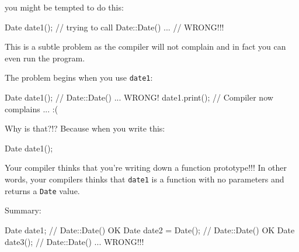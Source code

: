 you might be tempted to do this:

\begin{consolethree}[escapeinside=||]
Date date1();  // trying to call Date::Date() ...
               // WRONG!!!
\end{consolethree}

This is a subtle problem as the compiler will not complain and in fact
you can even run the program.

The problem begins when you use \texttt{date1}:

\begin{consolethree}[escapeinside=||]
Date date1();  // Date::Date() ... WRONG!
date1.print(); // Compiler now complains ... :(
\end{consolethree}

Why is that?!? Because when you write this:

\begin{consolethree}[escapeinside=||]
Date date1();
\end{consolethree}

Your compiler thinks that you're writing down a function
prototype!!! In other words, your compilers thinks that \texttt{date1} is
a function with no parameters and returns a \texttt{Date} value.

Summary:

\begin{consolethree}[escapeinside=||]
Date date1;              // Date::Date() OK
Date date2 = Date(); // Date::Date() OK
Date date3();            // Date::Date() ... WRONG!!!
\end{consolethree}


